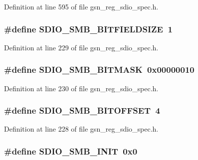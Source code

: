 Definition at line 595 of file gsn\_\-reg\_\-sdio\_\-spec.h.

\hypertarget{a00571_a274925ca769d4a3a2cd97f33d2bbef07}{
\subsubsection[{SDIO\_\-SMB\_\-BITFIELDSIZE}]{\setlength{\rightskip}{0pt plus 5cm}\#define SDIO\_\-SMB\_\-BITFIELDSIZE~1}}
\label{a00571_a274925ca769d4a3a2cd97f33d2bbef07}


Definition at line 229 of file gsn\_\-reg\_\-sdio\_\-spec.h.

\hypertarget{a00571_a1e83baee21564e4a24a51bf61c25ca0b}{
\subsubsection[{SDIO\_\-SMB\_\-BITMASK}]{\setlength{\rightskip}{0pt plus 5cm}\#define SDIO\_\-SMB\_\-BITMASK~0x00000010}}
\label{a00571_a1e83baee21564e4a24a51bf61c25ca0b}


Definition at line 230 of file gsn\_\-reg\_\-sdio\_\-spec.h.

\hypertarget{a00571_ac2bd69887aec12c4d09bb1ec56645cad}{
\subsubsection[{SDIO\_\-SMB\_\-BITOFFSET}]{\setlength{\rightskip}{0pt plus 5cm}\#define SDIO\_\-SMB\_\-BITOFFSET~4}}
\label{a00571_ac2bd69887aec12c4d09bb1ec56645cad}


Definition at line 228 of file gsn\_\-reg\_\-sdio\_\-spec.h.

\hypertarget{a00571_a026804036d24ec9a884c866dd2cee05c}{
\subsubsection[{SDIO\_\-SMB\_\-INIT}]{\setlength{\rightskip}{0pt plus 5cm}\#define SDIO\_\-SMB\_\-INIT~0x0}}
\label{a00571_a026804036d24ec9a884c866dd2cee05c}


